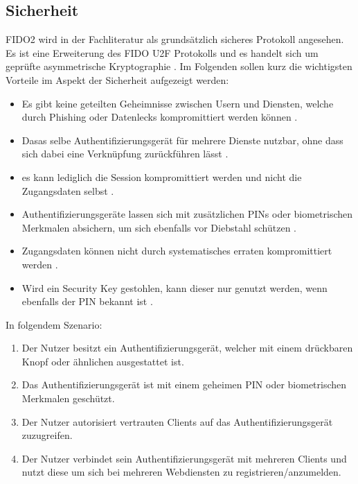 \subsection{Sicherheit}

\ac{FIDO}2 wird in der Fachliteratur als grundsätzlich sicheres Protokoll angesehen. Es ist eine Erweiterung des \ac{FIDO} \ac{U2F} Protokolls und es handelt sich um geprüfte asymmetrische Kryptographie \cite{lyastani2020fido2} \cite{farke2020you}. Im Folgenden sollen kurz die wichtigsten Vorteile im Aspekt der Sicherheit aufgezeigt werden:


\begin{itemize}
    \item Es gibt keine geteilten Geheimnisse zwischen Usern und Diensten, welche durch Phishing oder Datenlecks kompromittiert werden können \cite{lyastani2020fido2} \cite{farke2020you}. 
    \item Dasas selbe Authentifizierungsgerät für mehrere Dienste nutzbar, ohne dass sich dabei eine Verknüpfung zurückführen lässt \cite{lyastani2020fido2} \cite{farke2020you}.
    \item es kann lediglich die Session kompromittiert werden und nicht die Zugangsdaten selbst \cite{morii2017research}.
    \item Authentifizierungsgeräte lassen sich mit zusätzlichen PINs oder biometrischen Merkmalen absichern, um sich ebenfalls vor Diebstahl schützen \cite{barbosa2021provable}.
    \item Zugangsdaten können nicht durch systematisches erraten kompromittiert werden \cite{barbosa2021provable}.
    \item Wird ein Security Key gestohlen, kann dieser nur genutzt werden, wenn ebenfalls der PIN bekannt ist \cite{barbosa2021provable}.
\end{itemize}

In folgendem Szenario:

\begin{enumerate}
    \item Der Nutzer besitzt ein Authentifizierungsgerät, welcher mit einem drückbaren Knopf oder ähnlichen ausgestattet ist.
    \item Das Authentifizierungsgerät ist mit einem geheimen PIN oder biometrischen Merkmalen geschützt.
    \item Der Nutzer autorisiert vertrauten Clients auf das Authentifizierungsgerät zuzugreifen.
    \item Der Nutzer verbindet sein Authentifizierungsgerät mit mehreren Clients und nutzt diese um sich bei mehreren Webdiensten zu registrieren/anzumelden.
\end{enumerate}

